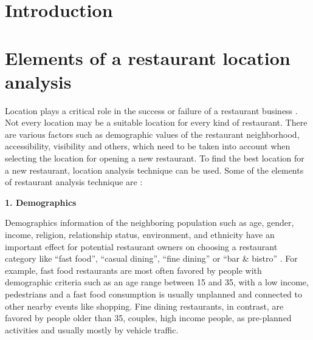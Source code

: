 \documentclass[a4paper, 11pt, oneside]{Thesis}  %
\begin{document}


\mainmatter	  %
\pagestyle{fancy}  %


\chapter{Introduction}

\chapter{Elements of a restaurant location analysis}
\label{elements}

Location plays a critical role in the success or failure of a restaurant business \cite{Tzeng.2002} \cite{Parsa.2005} \cite{Camillo.2008}. Not every location may be a suitable location for every kind of restaurant. There are various factors such as demographic values of the restaurant neighborhood, accessibility, visibility and others, which need to be taken into account when selecting the location for opening a new restaurant. To find the best location for a new restaurant, location analysis technique can be used. Some of the elements of restaurant analysis technique are \cite{EvanTarver.21.04.2017} \cite{Webstaurantstore.com.25.07.2018}:


 \textbf{1.	Demographics}

Demographics information of the neighboring population such as age, gender, income, religion, relationship status, environment, and ethnicity have an important effect for potential restaurant owners on choosing a restaurant category like “fast food”, “casual dining”, “fine dining” or “bar \& bistro” \cite{EvanTarver.21.04.2017}. For example, fast food restaurants are most often favored by people with demographic criteria such as an age range between 15 and 35, with a low income, pedestrians and a fast food consumption is usually unplanned and connected to other nearby events like shopping. Fine dining restaurants, in contrast, are favored by people older than 35, couples, high income people, as pre-planned activities and usually mostly by vehicle traffic.
\end{document}
